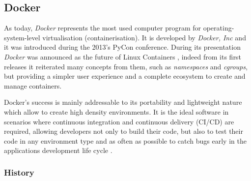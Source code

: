 \documentclass[a4paper,12pt]{article}
\begin{document}
\subsection{Docker}

As today, \textit{Docker} represents the most used computer program for
operating-system-level virtualisation (containerisation). It is developed by
\textit{Docker, Inc} \cite{docker_official_site} and it was introduced during
the 2013's PyCon conference. During its presentation \textit{Docker} was
announced as the future of Linux Containers \cite{docker_pycon_presentation},
indeed from its first releases it reiterated many concepts from them, such as
\textit{namespaces} and \textit{cgroups}, but providing a simpler user
experience and a complete ecosystem to create and manage containers.\par
Docker's success is mainly addressable to its portability and lightweight nature
which allow to create high density environments. It is the ideal software in
scenarios where continuous integration and continuous delivery (CI/CD) are
required, allowing developers not only to build their code, but also to test
their code in any environment type and as often as possible to catch bugs early
in the applications development life cycle \cite{docker_ci_cd}. 

\subsubsection{History}
\end{document}
